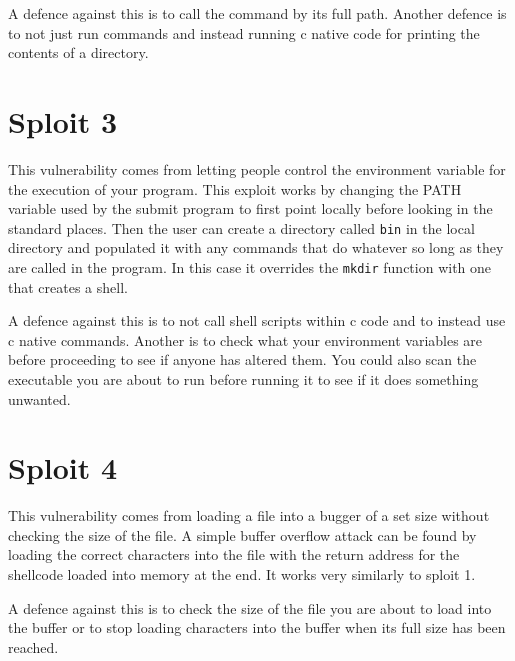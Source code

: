 \documentclass{article}
\begin{document}
A defence against this is to call the command by its full path. Another defence is to not just run commands and instead running c native code for printing the contents of a directory.

\section*{Sploit 3} %
\label{sec:sploit_3}
This vulnerability comes from letting people control the environment variable for the execution of your program. This exploit works by changing the PATH variable used by the submit program to first point locally before looking in the standard places. Then the user can create a directory called \texttt{bin} in the local directory and populated it with any commands that do whatever so long as they are called in the program. In this case it overrides the \texttt{mkdir} function with one that creates a shell.

A defence against this is to not call shell scripts within c code and to instead use c native commands. Another is to check what your environment variables are before proceeding to see if anyone has altered them. You could also scan the executable you are about to run before running it to see if it does something unwanted.

\section*{Sploit 4} %
\label{sec:sploit_4}
This vulnerability comes from loading a file into a bugger of a set size without checking the size of the file. A simple buffer overflow attack can be found by loading the correct characters into the file with the return address for the shellcode loaded into memory at the end. It works very similarly to sploit 1.

A defence against this is to check the size of the file you are about to load into the buffer or to stop loading characters into the buffer when its full size has been reached.
\end{document}
